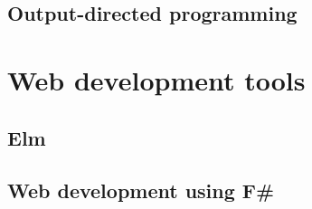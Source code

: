 \subsection{Output-directed programming}


\section{Web development tools}
\subsection{Elm}
\subsection{Web development using F\# }
